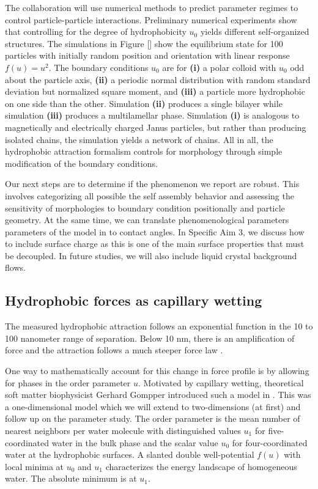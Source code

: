 The collaboration will use numerical methods to predict parameter regimes 
to control particle-particle interactions.  Preliminary numerical experiments
show that controlling for the degree of hydrophobicity $u_0$ yields different
self-organized structures.  The simulations in Figure [] show the equilibrium
state for 100 particles with initially random position and orientation
with linear response $f(u) = u^2$.  The 
boundary conditions $u_0$ are for \textbf{(i)} a polar colloid with $u_0$ odd about the 
particle axis, \textbf{(ii)} a periodic normal distribution with random 
standard deviation but normalized square moment, and  
\textbf{(iii)} a particle more hydrophobic on one side than the other. 
Simulation \textbf{(ii)}  produces a single bilayer while simulation \textbf{(iii)}
produces a multilamellar phase.  Simulation \textbf{(i)} is analogous to 
magnetically and electrically charged Janus particles, but rather than producing
isolated chains, the simulation yields a network of chains.
All in all, the hydrophobic attraction formalism controls for morphology through 
simple modification of the boundary conditions.

Our next steps are to determine if the phenomenon we report are robust.
This involves categorizing all possible the self assembly behavior
and assessing the sensitivity of morphologies to boundary condition positionally
and particle geometry.  At the same time, we can  
translate phenomenological parameters parameters
of the model in to contact angles. In Specific Aim 3, we discuss how to include 
surface charge as this is one of the main surface properties that must be decoupled.
In future studies, we will also include liquid crystal background flows.

\subsection{Hydrophobic forces as capillary wetting} 
The measured hydrophobic attraction follows an exponential function
in the 10 to 100 nanometer range of separation.  Below 10 nm, there 
is an amplification of force and the attraction follows a much steeper 
force law \cite{Lietal05}. 

One way to mathematically account for this change in force profile is by
allowing for phases in the order parameter $u$.
Motivated by capillary wetting, theoretical soft matter biophysicist Gerhard Gompper 
introduced such a model in \cite{GoHaKo94}. This was a one-dimensional
model which we will extend to two-dimensions (at first) and follow up on the parameter study. 
The order parameter is the mean number of nearest neighbors per water molecule
with distinguished values $u_1$ for five-coordinated water in the bulk phase and 
the scalar value $u_0$ for four-coordinated water at the hydrophobic surfaces.  
A slanted double well-potential $f(u)$ with local minima at $u_0$ and $u_1$ 
characterizes the energy landscape of homogeneous water.   The absolute minimum
is at $u_1$. 

